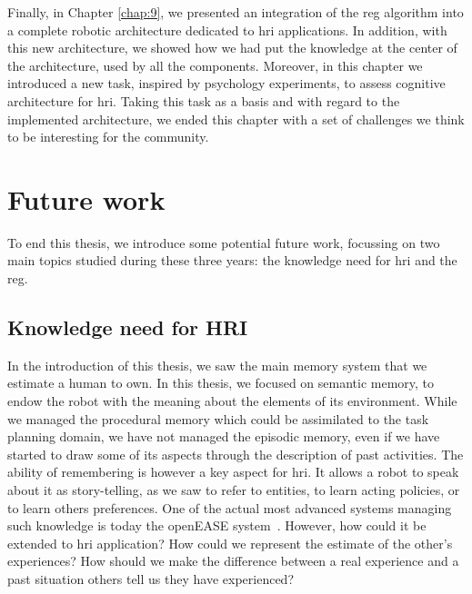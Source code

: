 Finally, in Chapter \ref{chap:9}, we presented an integration of the \acrshort{reg} algorithm into a complete robotic architecture dedicated to \acrshort{hri} applications. In addition, with this new architecture, we showed how we had put the knowledge at the center of the architecture, used by all the components. Moreover, in this chapter we introduced a new task, inspired by psychology experiments, to assess cognitive architecture for \acrshort{hri}. Taking this task as a basis and with regard to the implemented architecture, we ended this chapter with a set of challenges we think to be interesting for the community.

\section*{Future work}

To end this thesis, we introduce some potential future work, focussing on two main topics studied during these three years: the knowledge need for \acrshort{hri} and the \acrshort{reg}.

\subsection*{Knowledge need for HRI}

In the introduction of this thesis, we saw the main memory system that we estimate a human to own. In this thesis, we focused on semantic memory, to endow the robot with the meaning about the elements of its environment. While we managed the procedural memory which could be assimilated to the task planning domain, we have not managed the episodic memory, even if we have started to draw some of its aspects through the description of past activities. The ability of remembering is however a key aspect for \acrshort{hri}. It allows a robot to speak about it as story-telling, as we saw to refer to entities, to learn acting policies, or to learn others preferences. One of the actual most advanced systems managing such knowledge is today the openEASE system~\cite{beetz_2015_open}. However, how could it be extended to \acrshort{hri} application? How could we represent the estimate of the other's experiences? How should we make the difference between a real experience and a past situation others tell us they have experienced?

